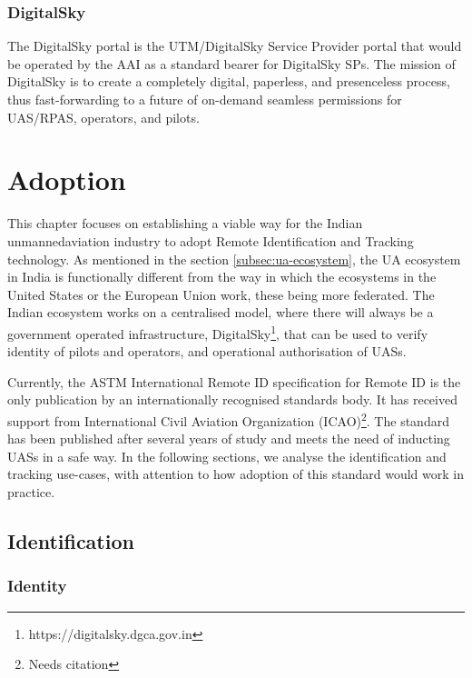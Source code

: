 \documentclass{ua_wgs_base}
\begin{document}
\subsection{DigitalSky}

The DigitalSky portal is the UTM/DigitalSky Service Provider portal
that would be operated by the AAI as a standard bearer for DigitalSky SPs.
The mission of DigitalSky is to create a completely digital, paperless,
and presenceless process, thus fast-forwarding to a future of on-demand
seamless permissions for UAS/RPAS,
operators, and pilots.

\cleardoublepage{}

\chapter{Adoption}

This chapter focuses on establishing a viable way for the Indian unmannedaviation
industry to adopt Remote Identification and Tracking technology. As
mentioned in the section \ref{subsec:ua-ecosystem}, the UA ecosystem
in India is functionally different from the way in which the ecosystems
in the United States or the European Union work, these being more
federated. The Indian ecosystem works on a centralised model, where
there will always be a government operated infrastructure, DigitalSky\footnote{https://digitalsky.dgca.gov.in},
that can be used to verify identity of pilots and operators, and operational
authorisation of UASs.

Currently, the ASTM International Remote ID specification for Remote
ID \cite{ASTM:F3411:19} is the only publication by an internationally
recognised standards body. It has received support from International
Civil Aviation Organization (ICAO)\footnote{Needs citation}.
The standard has been published after several years of study and meets
the need of inducting UASs in a safe way. In the following sections,
we analyse the identification and tracking use-cases, with attention
to how adoption of this standard \cite{ASTM:F3411:19} would work in practice.

\section{Identification}

\subsection{Identity}
\end{document}
